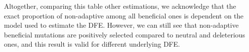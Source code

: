 \documentclass{article}
\begin{document}
    Altogether, comparing this table other estimations, we acknowledge that the exact proportion of non-adaptive among all beneficial ones is dependent on the model used to estimate the DFE.
    However, we can still see that non-adaptive beneficial mutations are positively selected compared to neutral and deleterious ones, and this result is valid for different underlying DFE.

    \newpage

    \printbibliography
\end{document}
